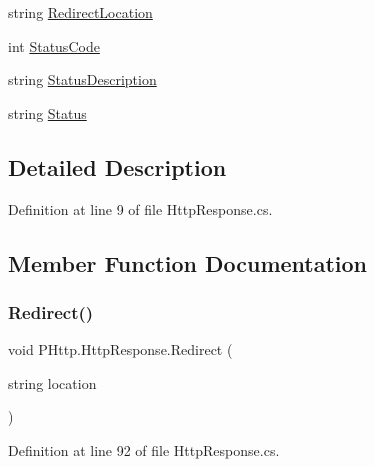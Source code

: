 \begin{DoxyCompactItemize}
\item 
string \hyperlink{class_p_http_1_1_http_response_aa0eb4a96bfbbefdac522df852d6adc2f}{Redirect\+Location}
\item 
int \hyperlink{class_p_http_1_1_http_response_a866c2c9fe87e0f38de6b00dabce1c7a6}{Status\+Code}
\item 
string \hyperlink{class_p_http_1_1_http_response_aea3f13ebc451a00fe6a0f5e0d8247739}{Status\+Description}
\item 
string \hyperlink{class_p_http_1_1_http_response_ac468b6359e6c52f5972683756a2efaaf}{Status}
\end{DoxyCompactItemize}


\subsection{Detailed Description}


Definition at line 9 of file Http\+Response.\+cs.



\subsection{Member Function Documentation}
\mbox{\label{class_p_http_1_1_http_response_a5b53f914c9325785bfec60d574b4c56a}} 
\subsubsection{\texorpdfstring{Redirect()}{Redirect()}}
{\footnotesize\ttfamily void P\+Http.\+Http\+Response.\+Redirect (\begin{DoxyParamCaption}\item[{string}]{location }\end{DoxyParamCaption})}



Definition at line 92 of file Http\+Response.\+cs.

